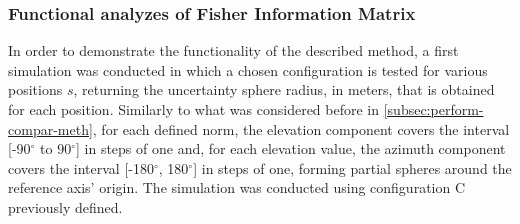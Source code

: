 \begin{table}[!htbp] %
	\begin{center}
		\caption{Obtained errors for configurations A,B and C by plane wavefront estimator}
		\label{tab:planewave-estimator-abc}
	\end{center}
\end{table}


\subsubsection{Functional analyzes of Fisher Information Matrix}

In order to demonstrate the functionality of the described method, a first simulation was conducted in which a chosen configuration is tested for various positions $s$, returning the uncertainty sphere radius, in meters, that is obtained for each position. Similarly to what was considered before in \ref{subsec:perform-compar-meth}, for each defined norm, the elevation component covers the interval [-90$^{\circ}$ to 90$^{\circ}$] in steps of one and, for each elevation value, the azimuth component covers the interval [-180$^{\circ}$, 180$^{\circ}$] in steps of one, forming partial spheres around the reference axis' origin. The simulation was conducted using configuration C previously defined.

